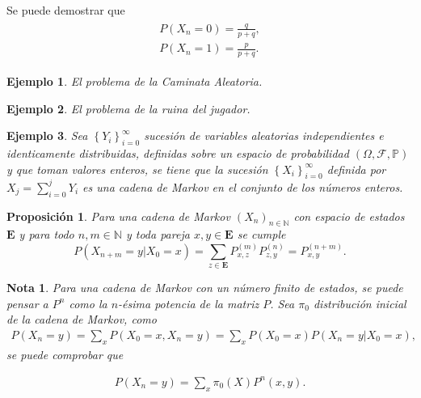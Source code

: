 \documentclass{article}
\newtheorem{Ejem}{Ejemplo}[section]
\newtheorem{Note}{Nota}[section]
\newtheorem{Prop}{Proposición}[section]
\newcommand{\nat}{\mathbb{N}}
\newcommand{\Eb}{\mathbf{E}}
\newcommand{\prob}{\mathbb{P}}
\numberwithin{equation}{section}
\begin{document}
Se puede demostrar que
\begin{eqnarray}
\begin{array}{l}
P\left(X_{n}=0\right)=\frac{q}{p+q},\\
P\left(X_{n}=1\right)=\frac{p}{p+q}.
\end{array}
\end{eqnarray}

\begin{Ejem}
El problema de la Caminata Aleatoria.
\end{Ejem}

\begin{Ejem}
El problema de la ruina del jugador.
\end{Ejem}

\begin{Ejem}
Sea $\left\{Y_{i}\right\}_{i=0}^{\infty}$ sucesi\'on de variables aleatorias independientes e identicamente distribuidas, definidas sobre un espacio de probabilidad $\left(\Omega,\mathcal{F},\prob\right)$ y que toman valores enteros, se tiene que la sucesi\'on $\left\{X_{i}\right\}_{i=0}^{\infty}$ definida por $X_{j}=\sum_{i=0}^{j}Y_{i}$ es una cadena de Markov en el conjunto de los n\'umeros enteros.
\end{Ejem}

\begin{Prop}
Para una cadena de Markov $\left(X_{n}\right)_{n\in\nat}$ con espacio de estados $\Eb$ y para todo $n,m\in \nat$ y toda pareja $x,y\in\Eb$ se cumple
\begin{equation}
P\left(X_{n+m}=y|X_{0}=x\right)=\sum_{z\in\Eb}P_{x,z}^{(m)}P_{z,y}^{(n)}=P_{x,y}^{(n+m)}.
\end{equation}
\end{Prop}

\begin{Note}
Para una cadena de Markov con un n\'umero finito de estados, se puede pensar a $P^{n}$ como la $n$-\'esima potencia de la matriz $P$. Sea $\pi_{0}$ distribuci\'on inicial de la cadena de Markov, como 
\begin{eqnarray}
P\left(X_{n}=y\right)=\sum_{x} P\left(X_{0}=x,X_{n}=y\right)=\sum_{x} P\left(X_{0}=x\right)P\left(X_{n}=y|X_{0}=x\right),
\end{eqnarray}
se puede comprobar que 

\begin{eqnarray}
P\left(X_{n}=y\right)=\sum_{x} \pi_{0}\left(X\right)P^{n}\left(x,y\right).
\end{eqnarray}
\end{Note}
\end{document}
